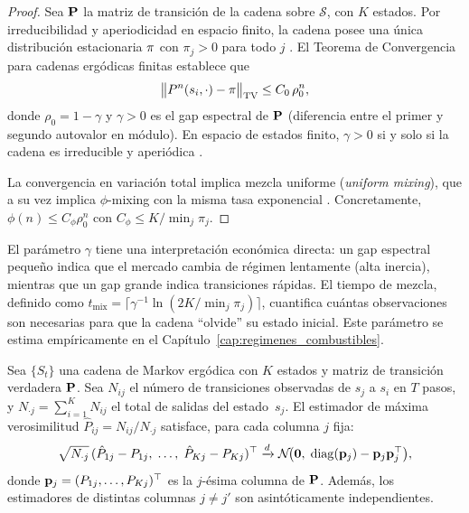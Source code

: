 \begin{proof}
Sea $\mathbf{P}$ la matriz de transición de la cadena sobre
$\mathcal{S}$, con $K$ estados.  Por irreducibilidad y aperiodicidad
en espacio finito, la cadena posee una única distribución
estacionaria $\mathbf{\pi}$ con $\pi_j > 0$ para todo $j$
\cite{Norris1998, Levin2009}.  El Teorema
de Convergencia para cadenas ergódicas finitas establece que
\[
\bigl\|P^n(s_i, \cdot) - \mathbf{\pi}\bigr\|_{\mathrm{TV}}
\leq C_0 \, \rho_0^n,
\]
donde $\rho_0 = 1 - \gamma$ y $\gamma > 0$ es el gap espectral de
$\mathbf{P}$ (diferencia entre el primer y segundo autovalor en módulo).
En espacio de estados finito, $\gamma > 0$ si y solo si la cadena es
irreducible y aperiódica \cite{Levin2009}.

La convergencia en variación total implica mezcla uniforme
(\textit{uniform mixing}), que a su vez implica $\phi$-mixing con la
misma tasa exponencial \cite{Bradley2005}.  Concretamente,
$\phi(n) \leq C_\phi \rho_0^n$ con $C_\phi \leq K / \min_j \pi_j$.
\end{proof}

\begin{remark}
\label{rem:gap_espectral}
El parámetro $\gamma$ tiene una interpretación económica directa: un
gap espectral pequeño indica que el mercado cambia de régimen
lentamente (alta inercia), mientras que un gap grande indica
transiciones rápidas.  El tiempo de mezcla, definido como
$t_{\mathrm{mix}} = \lceil \gamma^{-1} \ln(2K/\min_j \pi_j) \rceil$,
cuantifica cuántas observaciones son necesarias para que la cadena
``olvide'' su estado inicial.  Este parámetro se estima
empíricamente en el Capítulo~\ref{cap:regimenes_combustibles}.
\end{remark}


\begin{proposition}
\label{prop:normalidad_asintotica}
Sea $\{S_t\}$ una cadena de Markov ergódica con $K$ estados y matriz
de transición verdadera $\mathbf{P}$.  Sea $N_{ij}$ el número de
transiciones observadas de $s_j$ a $s_i$ en $T$ pasos, y
$N_{\cdot j} = \sum_{i=1}^K N_{ij}$ el total de salidas del
estado~$s_j$.  El estimador de máxima verosimilitud
$\hat{P}_{ij} = N_{ij} / N_{\cdot j}$ satisface, para cada columna
$j$ fija:
\[
\sqrt{N_{\cdot j}}\,
(\hat{P}_{1j} - P_{1j},\; \ldots,\; \hat{P}_{Kj} - P_{Kj})^\top
\xrightarrow{d}
\mathcal{N}\!\bigl(\mathbf{0},\;
\mathrm{diag}(\mathbf{p}_j) - \mathbf{p}_j \mathbf{p}_j^\top\bigr),
\]
donde $\mathbf{p}_j = (P_{1j}, \ldots, P_{Kj})^\top$ es la $j$-ésima
columna de $\mathbf{P}$.  Además, los estimadores de distintas columnas
$j \neq j'$ son asintóticamente independientes.
\end{proposition}

